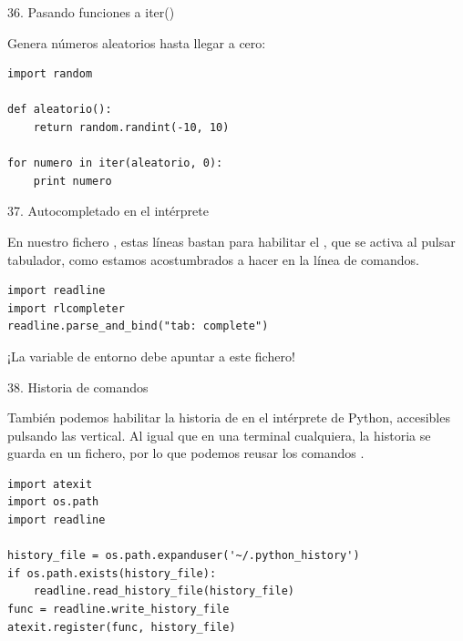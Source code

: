 \documentclass[14pt]{beamer}
\begin{document}
\begin{frame}[fragile]{36. Pasando funciones a iter()}
  \small
  \begin{exampleblock}
    {Genera números aleatorios hasta llegar a cero:}
    \begin{lstlisting}
import random

def aleatorio():
    return random.randint(-10, 10)

for numero in iter(aleatorio, 0):
    print numero
    \end{lstlisting}
  \end{exampleblock}
\end{frame}

\begin{frame}[fragile]{37. Autocompletado en el intérprete}
  \small
  \begin{block}{}
    \centering
    En nuestro fichero , estas líneas bastan para
    habilitar el , que se activa al pulsar
    tabulador, como estamos acostumbrados a hacer en la línea de
    comandos.
  \end{block}

  \begin{exampleblock}{}
    \begin{lstlisting}
import readline
import rlcompleter
readline.parse_and_bind("tab: complete")
    \end{lstlisting}
  \end{exampleblock}

  \footnotesize
  \begin{alertblock}{}
    \centering
    ¡La variable de entorno  debe apuntar a este fichero!
  \end{alertblock}
\end{frame}

\begin{frame}[fragile]{38. Historia de comandos}
  \small
  \begin{block}{}
    \centering
    También podemos habilitar la historia de  en el intérprete de Python, accesibles pulsando
    las  vertical. Al igual que en una
    terminal cualquiera, la historia se guarda en un fichero, por lo
    que podemos reusar los comandos .
  \end{block}

  \footnotesize
  \begin{exampleblock}{}
    \begin{lstlisting}
import atexit
import os.path
import readline

history_file = os.path.expanduser('~/.python_history')
if os.path.exists(history_file):
    readline.read_history_file(history_file)
func = readline.write_history_file
atexit.register(func, history_file)
    \end{lstlisting}
  \end{exampleblock}
\end{frame}
\end{document}
